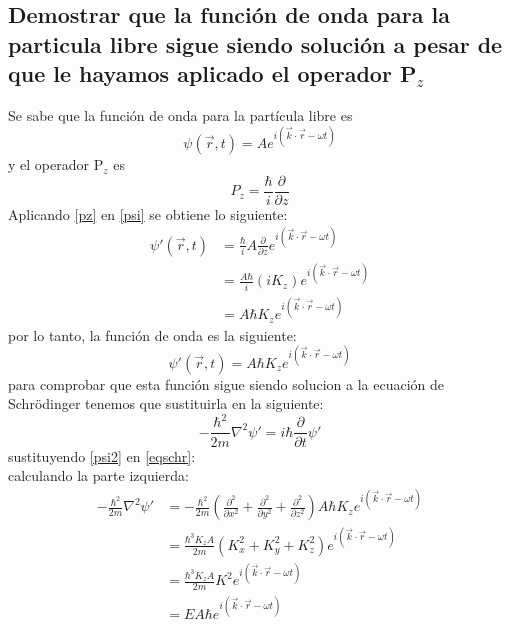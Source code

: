 \documentclass[12pt,letterpaper]{report}
\begin{document}
\subsection*{Demostrar que la función de onda para la particula libre sigue siendo solución a pesar de que le hayamos aplicado el operador P$_z$}
Se sabe que la función de onda para la partícula libre es
\begin{equation}
    \psi(\vec{r},t)=Ae^{i(\vec{k}\cdot\vec{r}-\omega t)}
    \label{psi}
\end{equation}
y el operador P$_z$ es
\begin{equation}
    P_z= \frac{\hbar}{i} \frac{\partial}{\partial z}
    \label{pz}
\end{equation}
Aplicando \ref{pz} en \ref{psi} se obtiene lo siguiente:
\begin{align*}
\psi'(\vec{r},t)&= \frac{\hbar}{i} A  \frac{\partial}{\partial z} e^{i(\vec{k}\cdot\vec{r}-\omega t)}\\
                &=\frac{A\hbar}{i} (iK_z) e^{i(\vec{k}\cdot\vec{r}-\omega t)}\\
                &= A\hbar K_z e^{i(\vec{k}\cdot\vec{r}-\omega t)}
\end{align*}
por lo tanto, la función de onda es la siguiente:
\begin{equation}
\psi'(\vec{r},t)=A\hbar K_z e^{i(\vec{k}\cdot\vec{r}-\omega t)}
\label{psi2}
\end{equation}
para comprobar que esta función sigue siendo solucion a la ecuación de Schr\"odinger tenemos que sustituirla en la siguiente:
\begin{equation}
    \label{eqschr}
    -\frac{\hbar^2}{2m} \nabla^2 \psi' = i\hbar \frac{\partial}{\partial t} \psi'
\end{equation}
sustituyendo \ref{psi2} en \ref{eqschr}:\\
calculando la parte izquierda:
\begin{align*}
    -\frac{\hbar^2}{2m} \nabla^2 \psi'  &= -\frac{\hbar^2}{2m} \left(\frac{\partial^2}{\partial x^2} +\frac{\partial^2}{\partial y^2}+\frac{\partial^2}{\partial z^2}\right)A\hbar K_z e^{i(\vec{k}\cdot \vec{r}-\omega t)}\\
                                        &= \frac{\hbar^3 K_z A}{2m}  (K_x^2+K_y^2+K_z^2) e^{i(\vec{k}\cdot \vec{r}-\omega t)}\\
                                        &= \frac{\hbar^3 K_z A}{2m} K^2 e^{i(\vec{k}\cdot \vec{r}-\omega t)}\\
                                        &= E A\hbar e^{i(\vec{k}\cdot \vec{r}-\omega t)}\\
\end{align*}
\end{document}
